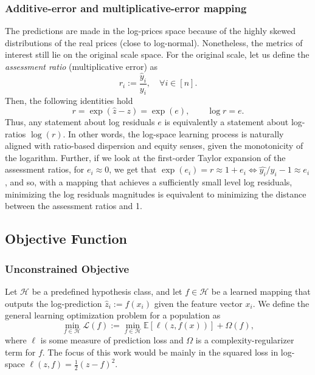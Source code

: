 \documentclass[11pt]{article}
\theoremstyle{plain}
\theoremstyle{definition}
\newcommand{\E}{\mathbb{E}}
\newcommand{\1}{\mathbf{1}}
\newcommand{\Cov}{\text{Cov}}
\newcommand{\D}{\mathcal{D}}
\renewcommand{\L}{\mathcal{L}}
\renewcommand{\H}{\mathcal{H}}
\begin{document}



\subsubsection{Additive-error and multiplicative-error mapping}
The predictions are made in the log-prices space because of the { highly skewed distributions of the real prices (close to log-normal)}. Nonetheless, the metrics of interest still lie on the original scale space. For the original scale, let us define the \textit{assessment ratio} (multiplicative error) as
\[
r_i := \frac{\hat y_i}{y_i}, \quad \forall i \in [n].
\]
Then, the following identities hold
\[
r = \exp(\hat z - z) = \exp(e),
\qquad \log r = e.
\]
Thus, any statement about log residuals \(e\) is equivalently a statement about log-ratios \(\log( r)\). In other words, the log-space learning process is naturally aligned with ratio-based dispersion and equity senses, given the monotonicity of the logarithm. Further, if we look at the first-order Taylor expansion of the assessment ratios, for $e_i\approx 0$, we get that $\exp(e_i) = r\approx 1 + e_i \iff {\hat{y_i}}/{y_i} - 1 \approx e_i$, and so, with a mapping that achieves a sufficiently small level log residuals, minimizing the log residuals magnitudes is equivalent to minimizing the distance between the assessment ratios and 1.   


\subsection{Objective Function}

\subsubsection{Unconstrained Objective}


Let $\mathcal H$ be a predefined hypothesis class, and let $f\in\mathcal H$ be a learned mapping that outputs the log-prediction $\hat z_i:=f(x_i)$ given the feature vector $x_i$. We define the general learning optimization problem for a population as 
\[
\min_{f\in \H} \L(f) := \min_{f\in \H} \E\!\left[\ell(z,f(x)) \right] + \Omega(f),%
\]
where \(\ell\) is some measure of prediction loss and $\Omega$ is a complexity-regularizer term for $f$. The focus of this work would be mainly in the squared loss in log-space $\ell(z,f)=\frac{1}{2}(z-f)^2$. 
\medskip
\end{document}
